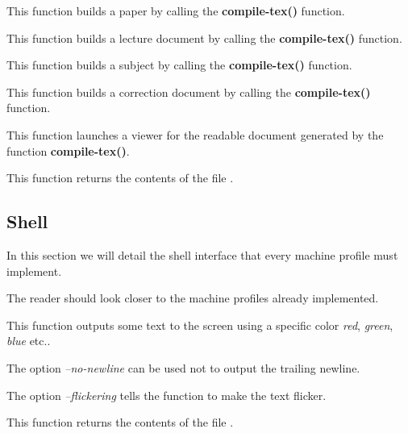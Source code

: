          {
	   This function builds a paper by calling the
	   \textbf{compile-tex()} function.
	 }

         {
	   This function builds a lecture document by calling the
	   \textbf{compile-tex()} function.
	 }

         {
	   This function builds a subject by calling the
	   \textbf{compile-tex()} function.
	 }

         {
	   This function builds a correction document by calling the
	   \textbf{compile-tex()} function.
	 }

         {
	   This function launches a viewer for the readable document
	   generated by the function \textbf{compile-tex()}.
	 }

         {
	   This function returns the contents of the file .
	 }

%
%

\subsection{Shell}

In this section we will detail the shell interface that every machine
profile must implement.

The reader should look closer to the machine profiles already implemented.

         {
	   This function outputs some text to the screen using a specific
	   color \textit{red}, \textit{green}, \textit{blue} etc..

	   The option \textit{--no-newline} can be used not to output
	   the trailing newline.

	   The option \textit{--flickering} tells the function to make
	   the text flicker.
	 }

         {
	   This function returns the contents of the file .
	 }


